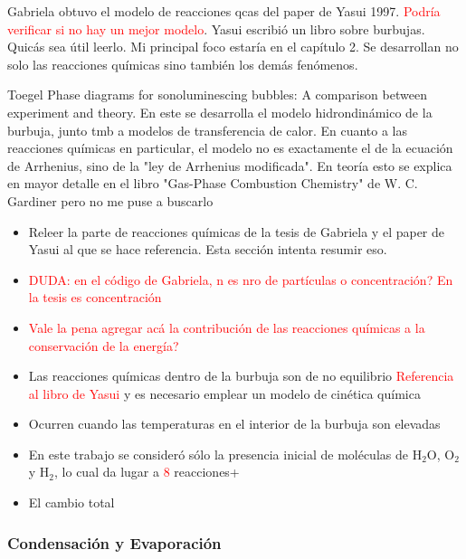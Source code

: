 \documentclass[aps,prb,twocolumn,superscriptaddress,floatfix,longbibliography,10pt]{revtex4-2}
\begin{document}
Gabriela obtuvo el modelo de reacciones qcas del paper de Yasui 1997. \textcolor{red}{Podría verificar si no hay un mejor modelo}.
Yasui escribió un libro sobre burbujas. Quicás sea útil leerlo. Mi principal foco estaría en el capítulo 2. Se desarrollan no solo las reacciones químicas sino también los demás fenómenos.

Toegel Phase diagrams for sonoluminescing bubbles: A comparison between experiment and theory. En este se desarrolla el modelo hidrondinámico de la burbuja, junto tmb a modelos de transferencia de calor. En cuanto a las reacciones químicas en particular, el modelo no es exactamente el de la ecuación de Arrhenius, sino de la "ley de Arrhenius modificada". En teoría esto se explica en mayor detalle en el libro "Gas-Phase Combustion Chemistry" de W. C. Gardiner pero no me puse a buscarlo



\begin{itemize}
  \item Releer la parte de reacciones químicas de la tesis de Gabriela y el paper de Yasui al que se hace referencia. Esta sección intenta resumir eso.
  \item \textcolor{red}{DUDA: en el código de Gabriela, n es nro de partículas o concentración? En la tesis es concentración}
  \item \textcolor{red}{Vale la pena agregar acá la contribución de las reacciones químicas a la conservación de la energía?}
\end{itemize}


\begin{itemize}
  \item Las reacciones químicas dentro de la burbuja son de no equilibrio \textcolor{red}{Referencia al libro de Yasui} y es necesario emplear un modelo de cinética química
  \item Ocurren cuando las temperaturas en el interior de la burbuja son elevadas
  \item En este trabajo se consideró sólo la presencia inicial de moléculas de $\mathrm{H_2O}$, $\mathrm{O_2}$ y $\mathrm{H_2}$, lo cual da lugar a \textcolor{red}{8} reacciones+
  \item El cambio total 

\end{itemize}




\subsubsection{Condensación y Evaporación}
\end{document}
